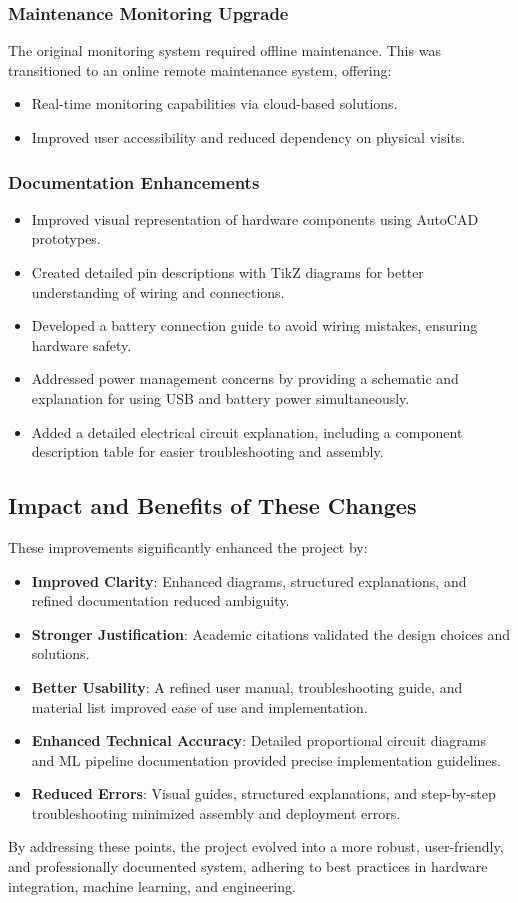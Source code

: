 \subsubsection{Maintenance Monitoring Upgrade}
The original monitoring system required offline maintenance. This was transitioned to an online remote maintenance system, offering:
\begin{itemize}
	\item Real-time monitoring capabilities via cloud-based solutions.
	\item Improved user accessibility and reduced dependency on physical visits.
\end{itemize}

\subsubsection{Documentation Enhancements}
\begin{itemize}
	\item Improved visual representation of hardware components using AutoCAD prototypes.
	\item Created detailed pin descriptions with TikZ diagrams for better understanding of wiring and connections.
	\item Developed a battery connection guide to avoid wiring mistakes, ensuring hardware safety.
	\item Addressed power management concerns by providing a schematic and explanation for using USB and battery power simultaneously.
	\item Added a detailed electrical circuit explanation, including a component description table for easier troubleshooting and assembly.
\end{itemize}

\subsection{Impact and Benefits of These Changes}
These improvements significantly enhanced the project by:
\begin{itemize}
	\item \textbf{Improved Clarity}: Enhanced diagrams, structured explanations, and refined documentation reduced ambiguity.
	\item \textbf{Stronger Justification}: Academic citations validated the design choices and solutions.
	\item \textbf{Better Usability}: A refined user manual, troubleshooting guide, and material list improved ease of use and implementation.
	\item \textbf{Enhanced Technical Accuracy}: Detailed proportional circuit diagrams and ML pipeline documentation provided precise implementation guidelines.
	\item \textbf{Reduced Errors}: Visual guides, structured explanations, and step-by-step troubleshooting minimized assembly and deployment errors.
\end{itemize}

By addressing these points, the project evolved into a more robust, user-friendly, and professionally documented system, adhering to best practices in hardware integration, machine learning, and engineering.

